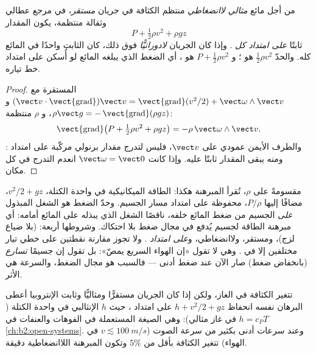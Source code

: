 \begin{theorem}[برنولي]\label{thm:b2:euler-bernoulli:bernoulli}
من أجل مائع \emph{مثالي} \emph{لاانضغاطي} منتظم الكثافة في
جريان \emph{مستقر}، في مرجع عطالي وثقالة منتظمة، يكون المقدار
\[
P + \tfrac12\rho v^2 + \rho gz
\]
ثابتًا \emph{على امتداد كل }. وإذا كان الجريان
\emph{لادورانيًّا} فوق ذلك، كان الثابت واحدًا في المائع كله.
والحدّ $\tfrac12\rho v^2$ هو \emph{}؛ و $P + \tfrac12\rho v^2$
هو \emph{}، أي الضغط الذي يبلغه المائع لو أُسكن على
امتداد خط تياره.
\end{theorem}

\begin{proof}
 المستقرة مع $(\vect v\cdot\operatorname{\vect{grad}})\vect v =
\operatorname{\vect{grad}}(v^2/2) + \vect\omega\wedge\vect v$ و $\rho\vect g =
-\operatorname{\vect{grad}}(\rho gz)$، و $\rho$ منتظمة:
\[
\operatorname{\vect{grad}}\bigl(P + \tfrac12\rho v^2 + \rho gz\bigr) = -\rho\,
\vect\omega\wedge\vect v .
\]
والطرف الأيمن عمودي على $\vect v$، فليس لتدرج مقدار برنولي
مركّبة على امتداد : ومنه يبقى المقدار ثابتًا عليه.
وإذا كانت $\vect\omega = \vect 0$ انعدم التدرج في كل مكان.
\end{proof}

\begin{remark}\label{rem:b2:euler-bernoulli:meaning}
مقسومةً على $\rho$، تُقرأ المبرهنة هكذا: الطاقة الميكانيكية في
واحدة الكتلة، $v^2/2 + gz$، مضافًا إليها $P/\rho$، محفوظة على امتداد
مسار الجسيم. وحدّ الضغط هو الشغل المبذول \emph{على} الجسيم من
ضغط المائع خلفه، ناقصًا الشغل الذي يبذله على المائع أمامه: أي
مبرهنة الطاقة لجسيم يُدفع في مجال ضغط بلا احتكاك. وشروطها
أربعة:  (بلا ضياع لزج)، ومستقر، ولاانضغاطي،
و\emph{على امتداد }. ولا تجوز مقارنة نقطتين على خطي
تيار مختلفين إلا في . وهي لا تقول «إن الهواء
السريع يمصّ»: بل تقول إن جسيمًا \emph{تسارع} (بانخفاض ضغط) صار
الآن عند ضغط أدنى --- فالسبب هو مجال الضغط، والسرعة هي الأثر.
\end{remark}

\begin{remark}\label{rem:b2:euler-bernoulli:compressible}
تتغير الكثافة في الغاز، ولكن إذا كان الجريان مستقرًّا ومثاليًّا
وثابت الإنتروبيا أعطى البرهان نفسه انحفاظ $h + v^2/2 + gz$
على امتداد ، حيث $h$ الإنثالبي في واحدة الكتلة ($h = c_PT$
في غاز مثالي): وهي الصيغة المستعملة في الفوهات والعنفات في
\cref{ch:b2:open-systems}. وعند سرعات أدنى بكثير من سرعة الصوت
($v \lesssim \qty{100}{m/s}$ في الهواء) تتغير الكثافة بأقل من $5\%$
وتكون المبرهنة اللاانضغاطية دقيقة.
\end{remark}

